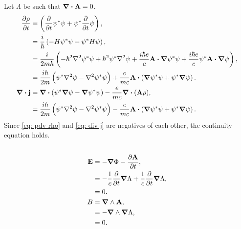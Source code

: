 \documentclass[a4paper,12pt,twoside]{article}
\begin{document}
\setcounter{section}{3}
\setcounter{subsection}{0}
\subsection{}%
Let $\Lambda$ be such that $\div{\vb{A}} = 0$.
\begin{align}
	\pdv{\rho}{t} &= \left(\pdv{t} \psi^* \psi + \psi^* \pdv{t}\psi \right),\\
	&= \frac{i}{\hbar} \left(-H\psi^*\psi + \psi^* H \psi\right),\\
	&= \frac{i}{2m\hbar} \left( -\hbar^2\laplacian{\psi^*}\psi + \hbar^2\psi^*\laplacian{\psi}
	+ \frac{i\hbar e}{c}\vb{A}\vdot\grad{\psi^*}\psi
	+ \frac{i\hbar e}{c}\psi^* \vb{A}\vdot\grad{\psi} \right),\\
	&= \frac{i\hbar}{2m}\left( \psi^*\laplacian{\psi} - \laplacian{\psi^*}\psi \right)
	+ \frac{e}{mc} \vb{A} \vdot \left( \grad{\psi^*} \psi + \psi^*\grad{\psi}\right).\label{eq: pdv rho}\\
	\div{\vb{j}} &= \div(\psi^*\grad{\psi}-\grad{\psi^*}\psi) - \frac{e}{mc} \div(\vb{A}\rho),\\
	&= \frac{i\hbar}{2m} \left(\psi^*\laplacian{\psi}-\laplacian{\psi^*}\psi\right)-\frac{e}{mc} \vb{A} \vdot \left(\grad{\psi^*}\psi+\psi^*\grad{\psi}\right).\label{eq: div j}
\end{align}
Since \ref{eq: pdv rho} and \ref{eq: div j} are negatives of each other, the continuity equation holds.

\subsection{}%
\subsubsection{}
\begin{align}
	\vb{E} &= -\grad{\Phi} - \pdv{\vb{A}}{t},\\
	&= -\frac{1}{c}\pdv{t}\grad{\Lambda} + \frac{1}{c}\pdv{t}\grad{\Lambda},\\
	&= 0.\\
	B &= \grad{}\wedge \vb{A},\\
	&= -\grad\wedge\grad{\Lambda},\\
	&= 0.
\end{align}
\subsubsection{}

\subsection{}%
\subsection{}%






\end{document}
